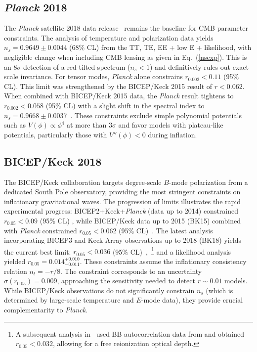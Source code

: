 \documentclass[aps,prev,twocolumn,preprintnumbers,floatfix,nofootinbib]{revtex4-1}
\begin{document}
\subsection*{\textbf{\textit{Planck} 2018}}
The \textit{Planck} satellite 2018 data release~\cite{Planck} remains the baseline for CMB parameter constraints. The analysis of temperature and polarization data yields $n_s = 0.9649 \pm 0.0044$ (68\% CL) from the TT, TE, EE + low E + likelihood, with negligible change when including CMB lensing as given in Eq.~(\ref{nsexp}). This is an $8\sigma$ detection of a red-tilted spectrum ($n_s < 1$) and definitively rules out exact scale invariance. For tensor modes, \textit{Planck} alone constrains $r_{0.002} < 0.11$ (95\% CL).
This limit was strengthened by the BICEP/Keck 2015 result of $r < 0.062$. 
When combined with BICEP/Keck 2015 data, the {\it Planck} result tightens to $r_{0.002} < 0.058$ (95\% CL) with a slight shift in the spectral index to $n_s = 0.9668 \pm 0.0037$~\cite{Planck}. These constraints exclude simple polynomial potentials such as $V(\phi) \propto \phi^4$ at more than $3\sigma$ and favor models with plateau-like potentials, particularly those with $V''(\phi) < 0$ during inflation.


\subsection*{BICEP/Keck 2018}
The BICEP/Keck collaboration targets degree-scale $B$-mode polarization from a dedicated South Pole observatory, providing the most stringent constraints on inflationary gravitational waves. The progression of limits illustrates the rapid experimental progress: BICEP2+Keck+\textit{Planck} (data up to 2014) constrained $r_{0.05} < 0.09$ (95\% CL) \cite{Planck:2015fie}, while BICEP/Keck data up to 2015 (BK15) combined with \textit{Planck} constrained $r_{0.05} < 0.062$ (95\% CL)~\cite{BICEP2:2018kqh}. The latest analysis incorporating BICEP3 and Keck Array observations up to 2018 (BK18) yields the current best limit: $r_{0.05} < 0.036$ (95\% CL)~\cite{BICEP2021},~\footnote{A subsequent analysis in~\cite{Tristram:2021tvh} used BB autocorrelation data from \cite{PR4} and obtained $r_{0.05} < 0.032$, allowing for a free reionization optical depth.} and a likelihood analysis yielded $r_{0.05} = 0.014^{+0.010}_{-0.011}$. These constraints assume the inflationary consistency relation $n_t = -r/8$. 
The constraint corresponds to an uncertainty $\sigma(r_{0.05}) = 0.009$, approaching the sensitivity needed to detect $r \sim 0.01$ models. While BICEP/Keck observations do not significantly constrain $n_s$ (which is determined by large-scale temperature and $E$-mode data), they provide crucial complementarity to \textit{Planck}. 
\end{document}
